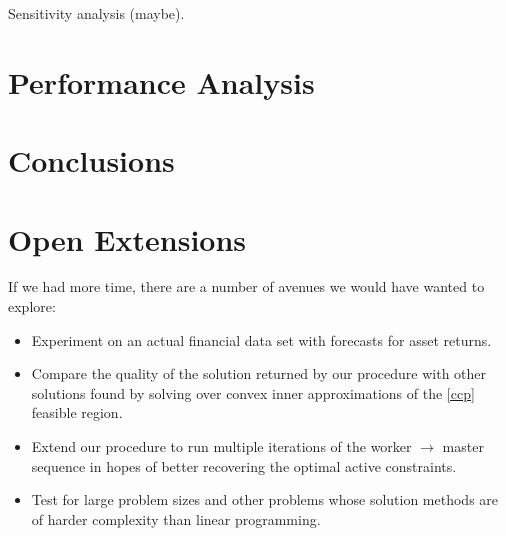 \documentclass[12pt]{article}
\begin{document}
Sensitivity analysis (maybe).
\section*{Performance Analysis}

\section*{Conclusions}

\section*{Open Extensions}
If we had more time, there are a number of avenues we would have wanted to explore:
\begin{itemize}
\item Experiment on an actual financial data set with forecasts for asset returns.
\item Compare the quality of the solution returned by our procedure with other solutions found by solving over convex inner approximations of the \ref{ccp} feasible region.
\item Extend our procedure to run multiple iterations of the worker $\to$ master sequence in hopes of better recovering the optimal active constraints.
\item Test for large problem sizes and other problems whose solution methods are of harder complexity than linear programming.
\end{itemize}

%
%


 
\end{document}
